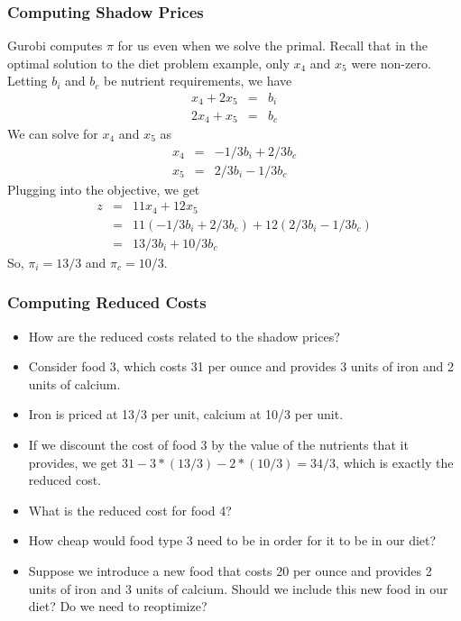 \documentclass[12pt,handout]{beamer}
\begin{document}
\begin{frame}
\frametitle{Computing Shadow Prices}
Gurobi computes $\pi$ for us even when we solve the primal. Recall that in the optimal solution to the diet problem example, only $x_4$ and $x_5$ were non-zero. Letting $b_i$ and $b_c$ be nutrient requirements, we have
\begin{eqnarray}
x_4 + 2 x_5 &=& b_i \nonumber \\
2 x_4 + x_5 &=& b_c \nonumber
\end{eqnarray}
We can solve for $x_4$ and $x_5$ as
\begin{eqnarray}
x_4 &=& -1/3 b_i + 2/3 b_c \nonumber \\
x_5 &=& 2/3 b_i - 1/3 b_c \nonumber
\end{eqnarray}
Plugging into the objective, we get
\begin{eqnarray}
z &=& 11x_4 + 12 x_5 \nonumber \\
&=& 11(-1/3 b_i + 2/3 b_c) + 12(2/3 b_i - 1/3 b_c) \nonumber \\
&=& 13/3 b_i + 10/3 b_c \nonumber
\end{eqnarray}
So, $\pi_i = 13/3$ and $\pi_c = 10/3$.
\end{frame}

\begin{frame}
\frametitle{Computing Reduced Costs}
\begin{itemize}
\item How are the reduced costs related to the shadow prices?
\item Consider food 3, which costs 31 per ounce and provides 3 units of iron and 2 units of calcium.
\item Iron is priced at 13/3 per unit, calcium at 10/3 per unit.
\item If we discount the cost of food 3 by the value of the nutrients that it provides, we get $31 - 3*(13/3) - 2*(10/3) = 34/3$, which is exactly the reduced cost.
\item What is the reduced cost for food 4?
\item How cheap would food type 3 need to be in order for it to be in our diet?
\item Suppose we introduce a new food that costs 20 per ounce and provides 2 units of iron and 3 units of calcium. Should we include this new food in our diet? Do we need to reoptimize?
\end{itemize}
\end{frame}
\end{document}
